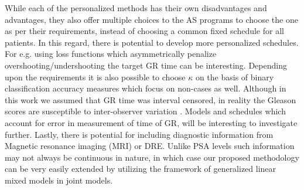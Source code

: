 While each of the personalized methods has their own disadvantages and advantages, they also offer multiple choices to the AS programs to choose the one as per their requirements, instead of choosing a common fixed schedule for all patients. In this regard, there is potential to develop more personalized schedules. For e.g. using loss functions which asymmetrically penalize overshooting/undershooting the target GR time can be interesting. Depending upon the requirements it is also possible to choose $\kappa$ on the basis of binary classification accuracy measures which focus on non-cases as well. Although in this work we assumed that GR time was interval censored, in reality the Gleason scores are susceptible to inter-observer variation \citep{Gleason_interobs_var}. Models and schedules which account for error in measurement of time of GR, will be interesting to investigate further. Lastly, there is potential for including diagnostic information from Magnetic resonance imaging (MRI) or DRE. Unlike PSA levels such information may not always be continuous in nature, in which case our proposed methodology can be very easily extended by utilizing the framework of generalized linear mixed models in joint models.
